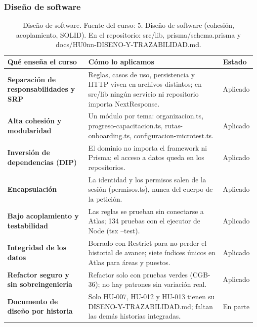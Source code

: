 \documentclass[11pt,a4paper]{article}
\begin{document}
\subsubsection*{Diseño de software}
\begin{table}[H]
\centering
\scriptsize
\renewcommand{\arraystretch}{1.2}
\begin{tabularx}{\linewidth}{|>{\raggedright\arraybackslash}p{3.6cm}|>{\raggedright\arraybackslash}X|>{\centering\arraybackslash}p{1.6cm}|}
\hline
\rowcolor{gray!15}
\textbf{Qué enseña el curso} & \textbf{Cómo lo aplicamos} & \textbf{Estado} \\
\hline
\textbf{Separación de responsabilidades y SRP} & Reglas, casos de uso, persistencia y HTTP viven en archivos distintos; en src/lib ningún servicio ni repositorio importa NextResponse. & Aplicado \\
\hline
\textbf{Alta cohesión y modularidad} & Un módulo por tema: organizacion.ts, progreso-capacitacion.ts, rutas-onboarding.ts, configuracion-microtest.ts. & Aplicado \\
\hline
\textbf{Inversión de dependencias (DIP)} & El dominio no importa el framework ni Prisma; el acceso a datos queda en los repositorios. & Aplicado \\
\hline
\textbf{Encapsulación} & La identidad y los permisos salen de la sesión (permisos.ts), nunca del cuerpo de la petición. & Aplicado \\
\hline
\textbf{Bajo acoplamiento y testabilidad} & Las reglas se prueban sin conectarse a Atlas; 134 pruebas con el ejecutor de Node (tsx --test). & Aplicado \\
\hline
\textbf{Integridad de los datos} & Borrado con Restrict para no perder el historial de avance; siete índices únicos en Atlas para áreas y puestos. & Aplicado \\
\hline
\textbf{Refactor seguro y sin sobreingeniería} & Refactor solo con pruebas verdes (CGB-36); no hay patrones sin variación real. & Aplicado \\
\hline
\textbf{Documento de diseño por historia} & Solo HU-007, HU-012 y HU-013 tienen su DISENO-Y-TRAZABILIDAD.md; faltan las demás historias integradas. & En parte \\
\hline
\end{tabularx}
\caption{Diseño de software. Fuente del curso: 5. Diseño de software (cohesión, acoplamiento, SOLID). En el repositorio: src/lib, prisma/schema.prisma y docs/HU0nn-DISENO-Y-TRAZABILIDAD.md.}
\end{table}
\end{document}
